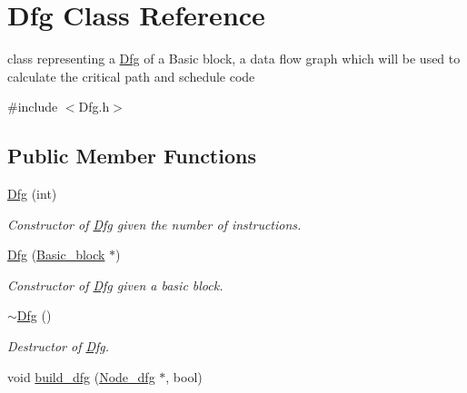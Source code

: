 \hypertarget{classDfg}{
\section{Dfg Class Reference}
\label{classDfg}
}


class representing a \hyperlink{classDfg}{Dfg} of a Basic block, a data flow graph which will be used to calculate the critical path and schedule code  


{\ttfamily \#include $<$Dfg.h$>$}\subsection*{Public Member Functions}
\begin{DoxyCompactItemize}
\item 
\hypertarget{classDfg_afea85053fd9702a5040dd0c57c7bb49a}{
\hyperlink{classDfg_afea85053fd9702a5040dd0c57c7bb49a}{Dfg} (int)}
\label{classDfg_afea85053fd9702a5040dd0c57c7bb49a}

\begin{DoxyCompactList}\small\item\em Constructor of \hyperlink{classDfg}{Dfg} given the number of instructions. \item\end{DoxyCompactList}\item 
\hypertarget{classDfg_aea8238bc912efa232319120cb1021fc1}{
\hyperlink{classDfg_aea8238bc912efa232319120cb1021fc1}{Dfg} (\hyperlink{classBasic__block}{Basic\_\-block} $\ast$)}
\label{classDfg_aea8238bc912efa232319120cb1021fc1}

\begin{DoxyCompactList}\small\item\em Constructor of \hyperlink{classDfg}{Dfg} given a basic block. \item\end{DoxyCompactList}\item 
\hypertarget{classDfg_a1422059d38caedf1ed3897a6f89109d8}{
\hyperlink{classDfg_a1422059d38caedf1ed3897a6f89109d8}{$\sim$Dfg} ()}
\label{classDfg_a1422059d38caedf1ed3897a6f89109d8}

\begin{DoxyCompactList}\small\item\em Destructor of \hyperlink{classDfg}{Dfg}. \item\end{DoxyCompactList}\item 
\hypertarget{classDfg_a32426a0b87ae751c5a43a00629bde5e5}{
void \hyperlink{classDfg_a32426a0b87ae751c5a43a00629bde5e5}{build\_\-dfg} (\hyperlink{classNode__dfg}{Node\_\-dfg} $\ast$, bool)}
\label{classDfg_a32426a0b87ae751c5a43a00629bde5e5}


\end{DoxyCompactItemize}

